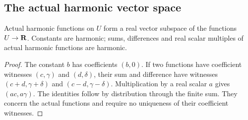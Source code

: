 \subsection{The actual harmonic vector space}\label{subsec:fc-line-harmonic-algebra}

\begin{lemma}\label{lem:fc-harmonic-vector-space}
\leanok
{}
Actual harmonic functions on $U$ form a real vector subspace of the functions
$U\to\mathbf{R}$. Constants are harmonic; sums, differences and real scalar multiples
of actual harmonic functions are harmonic.
\end{lemma}

\begin{proof}
The constant $b$ has coefficients $(b,0)$. If two functions have coefficient
witnesses $(c,\gamma)$ and $(d,\delta)$, their sum and difference have witnesses
$(c+d,\gamma+\delta)$ and $(c-d,\gamma-\delta)$. Multiplication by a real
scalar $a$ gives $(ac,a\gamma)$. The identities follow by distribution
through the finite sum. They concern the actual functions and require no
uniqueness of their coefficient witnesses.
\end{proof}
